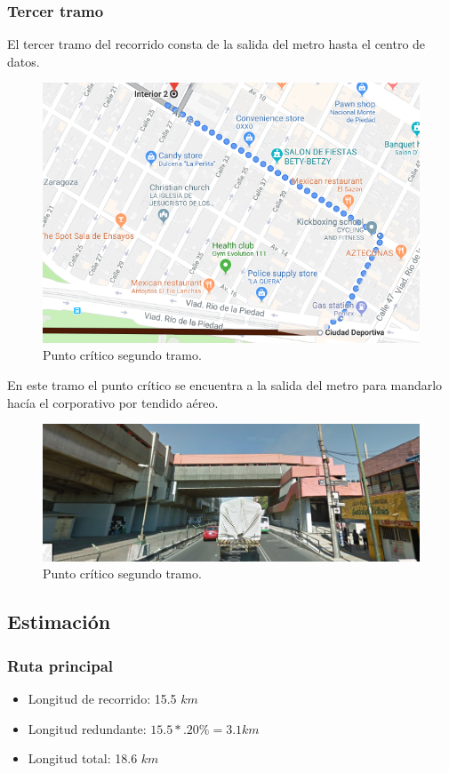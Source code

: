 \documentclass[12pt,letterpaper]{article}
\begin{document}
\newpage
\subsubsection{Tercer tramo}
El tercer tramo del recorrido consta de la salida del metro hasta
el centro de datos.
\begin{figure}[ht]
    \centering
    \includegraphics[width=.5\textwidth]{f9.png}
    \caption{Punto crítico segundo tramo.}
\end{figure}

En este tramo el punto crítico se encuentra a la salida del metro 
para mandarlo hacía el corporativo por tendido aéreo.
\begin{figure}[ht]
    \centering
    \includegraphics[width=.9\textwidth]{f10.png}
    \caption{Punto crítico segundo tramo.}
\end{figure}

\newpage
\subsection{Estimación}
\subsubsection{Ruta principal}
\begin{itemize}
    \item Longitud de recorrido: 15.5 $km$
    \item Longitud redundante: $15.5*.20\%=3.1km$
    \item Longitud total: 18.6 $km$
\end{itemize}
\end{document}
